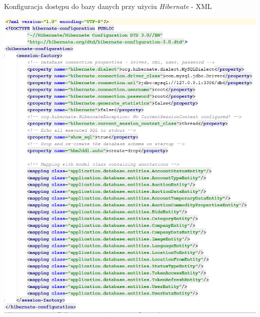 \documentclass[10pt,titlepage]{article} %
\begin{document}
\begin{listing}[H]
\caption[Konfiguracja dostępu do bazy danych przy użyciu \textit{Hibernate} - XML]{Konfiguracja dostępu do bazy danych przy użyciu \textit{Hibernate} - XML}
\includegraphics[width=1.0\textwidth, height=1.0\textheight, keepaspectratio]{img/sekcja3/bd/hibernateKonfiguracjaXML}
\end{listing}
\end{document}
